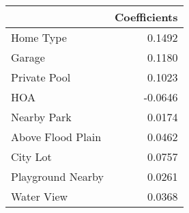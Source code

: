 \begin{table}[H]
\centering
\begin{tabular}{lr}
\toprule
 & Coefficients \\
\midrule
Home Type & 0.1492 \\
Garage & 0.1180 \\
Private Pool & 0.1023 \\
HOA & -0.0646 \\
Nearby Park & 0.0174 \\
Above Flood Plain & 0.0462 \\
City Lot & 0.0757 \\
Playground Nearby & 0.0261 \\
Water View & 0.0368 \\
\bottomrule
\end{tabular}
\end{table}
